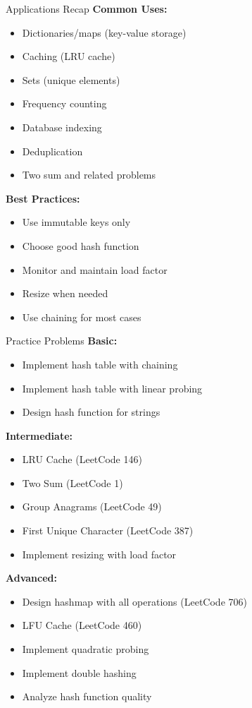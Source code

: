\documentclass[aspectratio=169]{beamer}
\begin{document}
\begin{frame}{Applications Recap}
  \textbf{Common Uses:}
  \begin{itemize}
    \item Dictionaries/maps (key-value storage)
    \item Caching (LRU cache)
    \item Sets (unique elements)
    \item Frequency counting
    \item Database indexing
    \item Deduplication
    \item Two sum and related problems
  \end{itemize}

  \vspace{0.3cm}
  \textbf{Best Practices:}
  \begin{itemize}
    \item Use immutable keys only
    \item Choose good hash function
    \item Monitor and maintain load factor
    \item Resize when needed
    \item Use chaining for most cases
  \end{itemize}
\end{frame}

\begin{frame}{Practice Problems}
  \textbf{Basic:}
  \begin{itemize}
    \item Implement hash table with chaining
    \item Implement hash table with linear probing
    \item Design hash function for strings
  \end{itemize}

  \vspace{0.3cm}
  \textbf{Intermediate:}
  \begin{itemize}
    \item LRU Cache (LeetCode 146)
    \item Two Sum (LeetCode 1)
    \item Group Anagrams (LeetCode 49)
    \item First Unique Character (LeetCode 387)
    \item Implement resizing with load factor
  \end{itemize}

  \vspace{0.3cm}
  \textbf{Advanced:}
  \begin{itemize}
    \item Design hashmap with all operations (LeetCode 706)
    \item LFU Cache (LeetCode 460)
    \item Implement quadratic probing
    \item Implement double hashing
    \item Analyze hash function quality
  \end{itemize}
\end{frame}
\end{document}
